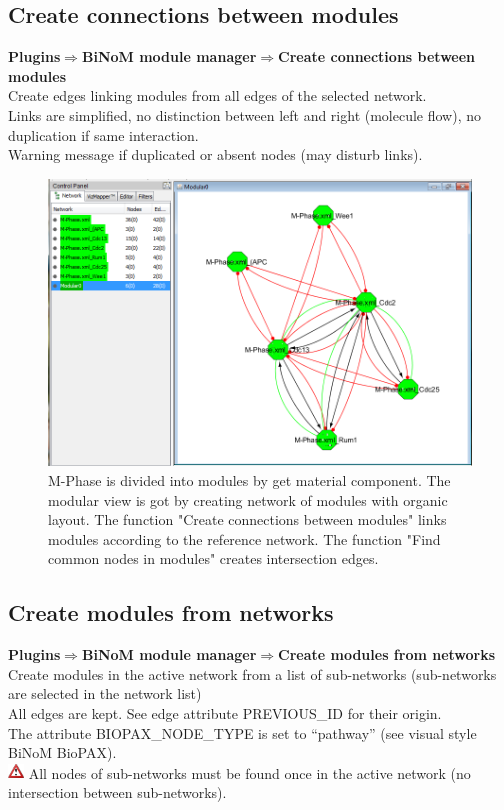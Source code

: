 \subsection{Create connections between modules}
\textbf{Plugins$\Rightarrow$BiNoM module manager$\Rightarrow$Create connections between modules}\\
Create edges linking modules from all edges of the selected network.\\
Links are simplified, no distinction between left and right (molecule flow), no duplication if same interaction.\\
Warning message if duplicated or absent nodes (may disturb links).
\begin{figure}
\centering
\includegraphics[width=19 cm]{graphics/M-Phase_Material_Modular}
\caption{M-Phase is divided into modules by get material component. The modular view is got by creating network of modules with organic layout. The function "Create connections between modules" links modules according to the reference network. The function "Find common nodes in modules" creates intersection edges. }
\label{M-Phase_Material_Modular}
\end{figure}

\subsection{Create modules from networks}
\textbf{Plugins$\Rightarrow$BiNoM module manager$\Rightarrow$Create modules from networks}\\
Create modules in the active network from a list of sub-networks (sub-networks are selected in the network list)\\
All edges are kept. See edge attribute PREVIOUS\_ID for their origin.\\
The attribute BIOPAX\_NODE\_TYPE is set to “pathway” (see visual style BiNoM BioPAX).\\
\includegraphics[width=12pt,height=12pt]{graphics/warning} All nodes of sub-networks must be found once in the active network (no intersection between sub-networks).

